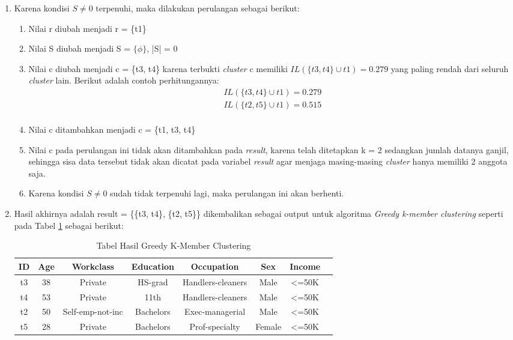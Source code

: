 \begin{enumerate}
\begin{enumerate}
\end{enumerate}

\item Karena kondisi $S \neq 0$ terpenuhi, maka dilakukan perulangan sebagai berikut:

\begin{enumerate}
\item Nilai r diubah menjadi r = \{t1\}
\item Nilai S diubah menjadi S = $\{\phi\}$, |S| = 0
\item Nilai c diubah menjadi c = \{t3, t4\} karena terbukti \textit{cluster} c memiliki $IL(\{t3,t4\} \cup t1)=0.279$ yang paling rendah dari seluruh \textit{cluster} lain. Berikut adalah contoh perhitungannya:
\begin{align*}
IL(\{t3,t4\} \cup t1) = 0.279 \\
IL(\{t2,t5\}\cup t1) = 0.515 \\
\end{align*}
\item Nilai c ditambahkan menjadi c = \{t1, t3, t4\}
\item Nilai c pada perulangan ini tidak akan ditambahkan pada \textit{result}, karena telah ditetapkan k = 2 sedangkan jumlah datanya ganjil, sehingga sisa data tersebut tidak akan dicatat pada variabel \textit{result} agar menjaga masing-masing \textit{cluster} hanya memiliki 2 anggota saja.
\item Karena kondisi $S \neq 0$ sudah tidak terpenuhi lagi, maka perulangan ini akan berhenti.

\end{enumerate}

\item Hasil akhirnya adalah result = \{\{t3, t4\}, \{t2, t5\}\} dikembalikan sebagai output untuk algoritma \textit{Greedy k-member clustering} seperti pada Tabel \ref{table:greedykmember} sebagai berikut:
\begin{table}[H]
\centering
\caption{Tabel Hasil Greedy K-Member Clustering}
\begin{tabular}{c c c c c c c c}
\hline 
ID & Age & Workclass & Education & Occupation & Sex & Income\\ 
\hline 
t3 & 38 & Private & HS-grad & Handlers-cleaners & Male & <=50K  \\ 
t4 & 53 & Private & 11th & Handlers-cleaners & Male & <=50K  \\ 
\hline 
t2 & 50 & Self-emp-not-inc & Bachelors & Exec-managerial & Male & <=50K  \\ 
t5 & 28 & Private & Bachelors & Prof-specialty & Female & <=50K	 \\ 
\hline 
\end{tabular} 
\label{table:greedykmember}
\end{table}

\end{enumerate}

